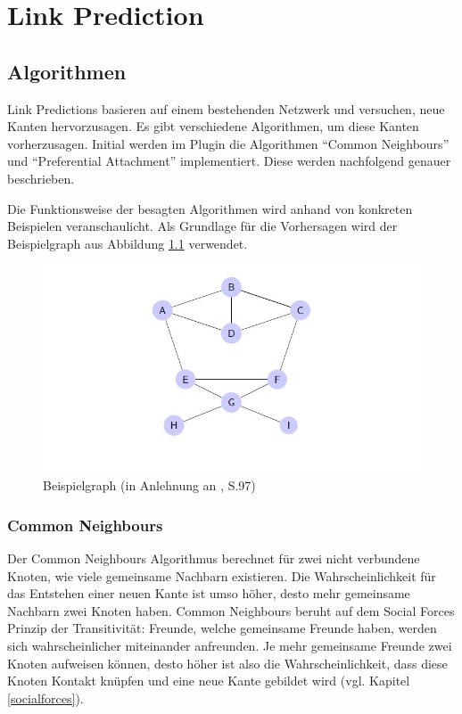 \chapter{Link Prediction}

\section{Algorithmen}
Link Predictions basieren auf einem bestehenden Netzwerk und versuchen, neue Kanten hervorzusagen.
Es gibt verschiedene Algorithmen, um diese Kanten vorherzusagen.
Initial werden im Plugin die Algorithmen ``Common Neighbours'' und ``Preferential Attachment'' implementiert. Diese werden nachfolgend genauer beschrieben.

Die Funktionsweise der besagten Algorithmen wird anhand von konkreten Beispielen veranschaulicht.
Als Grundlage für die Vorhersagen wird der Beispielgraph aus Abbildung \ref{fig:graph_bsp} verwendet.

\begin{figure}[h]
    \centering
    \includegraphics[scale=0.7]{resources/graph_example.JPG}
    \caption{Beispielgraph (in Anlehnung an \citeauthor{michael_henninger_soziale_2018} \citeyear{michael_henninger_soziale_2018}, S.97)}
    \label{fig:graph_bsp}
\end{figure}

\subsection{Common Neighbours}
Der Common Neighbours Algorithmus berechnet für zwei nicht verbundene Knoten, wie viele gemeinsame Nachbarn existieren.
Die Wahrscheinlichkeit für das Entstehen einer neuen Kante ist umso höher, desto mehr gemeinsame Nachbarn zwei
Knoten haben. Common Neighbours beruht auf dem Social Forces Prinzip der Transitivität: Freunde, welche gemeinsame
Freunde haben, werden sich wahrscheinlicher miteinander anfreunden. Je mehr gemeinsame Freunde zwei Knoten aufweisen können, desto
höher ist also die Wahrscheinlichkeit, dass diese Knoten Kontakt knüpfen und eine neue Kante gebildet wird (vgl. Kapitel \ref{socialforces}).


